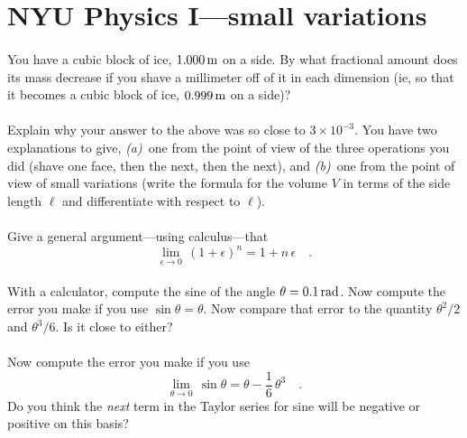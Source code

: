 \documentclass[12pt]{article}
\begin{document}
\section*{NYU Physics I---small variations}

\paragraph{\theproblem}%
You have a cubic block of ice, $1.000\,\mathrm{m}$ on a side.  By what
fractional amount does its mass decrease if you shave a millimeter off
of it in each dimension (ie, so that it becomes a cubic block of ice,
$0.999\,\mathrm{m}$ on a side)?

\paragraph{\theproblem}%
Explain why your answer to the above was so close to $3\times
10^{-3}$.  You have two explanations to give, \textsl{(a)}~one from
the point of view of the three operations you did (shave one face,
then the next, then the next), and \textsl{(b)}~one from the point of
view of small variations (write the formula for the volume $V$ in
terms of the side length $\ell$ and differentiate with respect to
$\ell$).

\paragraph{\theproblem}%
Give a general argument---using calculus---that
\begin{equation}
\lim_{\epsilon\rightarrow 0}\,(1+\epsilon)^n=1+n\,\epsilon \quad .
\end{equation}

\paragraph{\theproblem}%
With a calculator, compute the sine of the angle $\theta=0.1\,\mathrm{rad}$.
Now compute the error you make if you use $\sin\theta=\theta$.  Now
compare that error to the quantity $\theta^2/2$ and $\theta^3/6$.  Is
it close to either?

\paragraph{\theproblem}%
Now compute the error you make if you use
\begin{equation}
\lim_{\theta\rightarrow 0}\,\sin\theta=\theta-\frac{1}{6}\,\theta^3 \quad .
\label{eq:third}
\end{equation}
Do you think the \emph{next} term in the Taylor series for sine will
be negative or positive on this basis?
\end{document}
